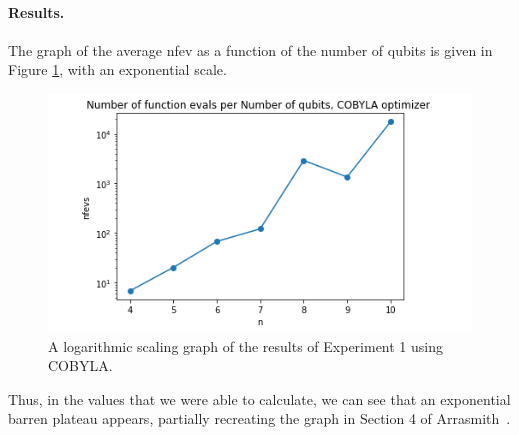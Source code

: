 \documentclass[a4paper,12pt]{article}
\newcommand{\mytodo}[1]{\textcolor{red}{TODO: #1}}
\begin{document}
\paragraph*{Results.}
The graph of the average nfev as a function of the number of qubits is given in Figure \ref{fig:recreation}, with an exponential scale.

\begin{figure}[]
    \centering
    \captionsetup{justification=centering, margin=0.1cm}
    \includegraphics[scale=0.8]{recreation.png}
    \caption{A logarithmic scaling graph of the results of Experiment 1 using COBYLA.}
    \label{fig:recreation}
\end{figure}


Thus, in the values that we were able to calculate, we can see that an exponential barren plateau appears, partially recreating the graph in Section 4 of Arrasmith~\cite{arrasmith_effect_2021}.
\end{document}

